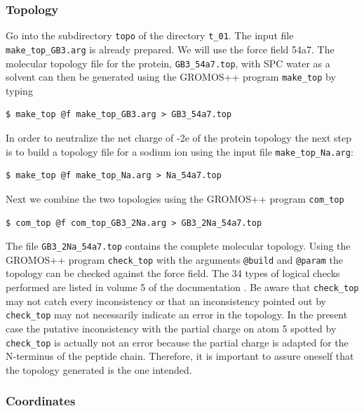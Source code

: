 \subsubsection{Topology}
Go into the subdirectory \texttt{topo} of the directory \texttt{t\_01}. The input file \texttt{make\_top\_GB3.arg} is already prepared. We will use the force field 54a7. 
The molecular topology file for the protein, \texttt{GB3\_54a7.top}, with SPC water as a solvent can then be generated using the GROMOS++ program \texttt{make\_top} 
by typing
\begin{lstlisting}
$ make_top @f make_top_GB3.arg > GB3_54a7.top
\end{lstlisting}
In order to neutralize the net charge of -2e of the protein topology the next step is to build a topology file for a sodium ion using the input file \texttt{make\_top\_Na.arg}:
\begin{lstlisting}
$ make_top @f make_top_Na.arg > Na_54a7.top
\end{lstlisting}
Next we combine the two topologies using the GROMOS++ program \texttt{com\_top}
\begin{lstlisting}
$ com_top @f com_top_GB3_2Na.arg > GB3_2Na_54a7.top
\end{lstlisting}
The file \texttt{GB3\_2Na\_54a7.top} contains the complete molecular topology. Using the GROMOS++ program \texttt{check\_top} with the arguments \texttt{@build} and \texttt{@param} the topology can be checked against the force field. 
The 34 types of logical checks performed are listed in volume 5 of the documentation \cite{volume_5}.
Be aware that \texttt{check\_top} may not catch every inconsistency 
or that an inconsistency pointed out by \texttt{check\_top} may not necessarily indicate an error in the topology.
In the present case the putative inconsistency with the partial charge on atom 5 spotted by \texttt{check\_top} is 
actually not an error because the partial charge is adapted for the N-terminus of the peptide chain.
Therefore, it is important to assure oneself that the topology generated is the one intended.

\subsubsection{Coordinates}

